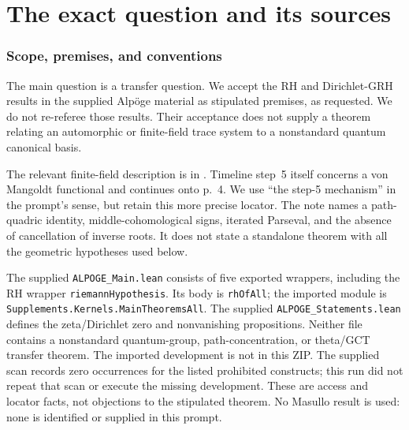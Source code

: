 \documentclass[11pt,a4paper]{article}
\theoremstyle{named}\newtheorem{finding}{Finding}[section]
\theoremstyle{definition}\newtheorem{definition}[finding]{Definition}
\theoremstyle{remark}\newtheorem{remark}[finding]{Remark}
\begin{document}
\begin{center}
\end{center}
\newpage\setcounter{tocdepth}{1}{\small\tableofcontents}\newpage

\part{The exact question and its sources}
\section{Scope, premises, and conventions}\label{sec:scope}
The main question is a transfer question. We accept the RH and Dirichlet-GRH results in the supplied Alp\"oge material as stipulated premises, as requested. We do not re-referee those results. Their acceptance does not supply a theorem relating an automorphic or finite-field trace system to a nonstandard quantum canonical basis.

The relevant finite-field description is in \cite[printed p.~3, footnote~3, attached to the paragraph before the timeline; also step~3]{Alpoge}. Timeline step~5 itself concerns a von Mangoldt functional and continues onto p.~4. We use ``the step-5 mechanism'' in the prompt's sense, but retain this more precise locator. The note names a path-quadric identity, middle-cohomological signs, iterated Parseval, and the absence of cancellation of inverse roots. It does not state a standalone theorem with all the geometric hypotheses used below.

The supplied \texttt{ALPOGE\_Main.lean} consists of five exported wrappers, including the RH wrapper \texttt{riemannHypothesis}. Its body is \texttt{rhOfAll}; the imported module is \texttt{Supplements.Kernels.\allowbreak MainTheoremsAll}. The supplied \texttt{ALPOGE\_Statements.lean} defines the zeta/Dirichlet zero and nonvanishing propositions. Neither file contains a nonstandard quantum-group, path-concentration, or theta/GCT transfer theorem. The imported development is not in this ZIP. The supplied scan records zero occurrences for the listed prohibited constructs; this run did not repeat that scan or execute the missing development. These are access and locator facts, not objections to the stipulated theorem. No Masullo result is used: none is identified or supplied in this prompt.
\end{document}

